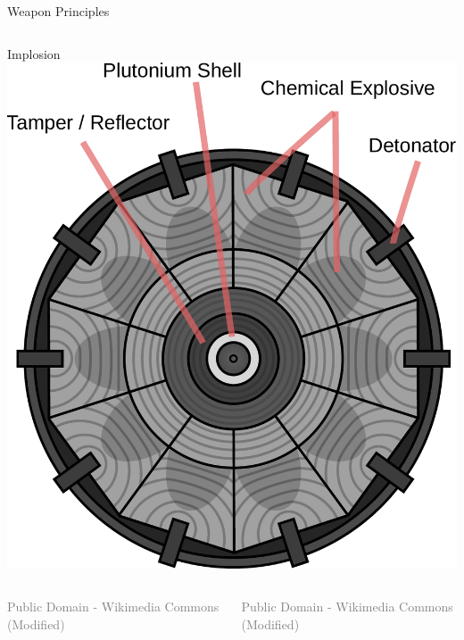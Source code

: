 \documentclass[presentation]{beamer}
\begin{document}
\begin{frame}[label=sec-1-5]{Weapon Principles}
\begin{columns}[t]
\begin{column}{0.45\textwidth}
\begin{block}{Implosion}
\includegraphics[width=\textwidth]{images/implosion_modified}
\end{block}
\end{column}
\end{columns}

\begin{columns}
\begin{column}{0.45\textwidth}
\tiny \textcolor{gray}{Public Domain - Wikimedia Commons (Modified)}
\end{column}

\begin{column}{0.45\textwidth}
\tiny \textcolor{gray}{Public Domain - Wikimedia Commons (Modified)}
\end{column}
\end{columns}
\end{frame}
\end{document}
